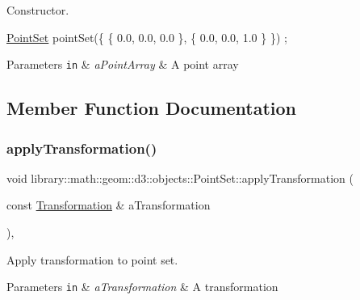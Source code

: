 Constructor. 


\begin{DoxyCode}
\hyperlink{classlibrary_1_1math_1_1geom_1_1d3_1_1objects_1_1_point_set_a6f9624b8c6bb3aa9d57a35a6fa2e0fba}{PointSet} pointSet(\{ \{ 0.0, 0.0, 0.0 \}, \{ 0.0, 0.0, 1.0 \} \}) ;
\end{DoxyCode}



\begin{DoxyParams}[1]{Parameters}
\mbox{\tt in}  & {\em a\+Point\+Array} & A point array \\
\hline
\end{DoxyParams}


\subsection{Member Function Documentation}
\mbox{\label{classlibrary_1_1math_1_1geom_1_1d3_1_1objects_1_1_point_set_aa747a6169cd9c14011c8249a728c3c48}} 
\subsubsection{\texorpdfstring{apply\+Transformation()}{applyTransformation()}}
{\footnotesize\ttfamily void library\+::math\+::geom\+::d3\+::objects\+::\+Point\+Set\+::apply\+Transformation (\begin{DoxyParamCaption}\item[{const \hyperlink{classlibrary_1_1math_1_1geom_1_1d3_1_1_transformation}{Transformation} \&}]{a\+Transformation }\end{DoxyParamCaption})\hspace{0.3cm}{\ttfamily [override]}, {\ttfamily [virtual]}}



Apply transformation to point set. 


\begin{DoxyParams}[1]{Parameters}
\mbox{\tt in}  & {\em a\+Transformation} & A transformation \\
\hline
\end{DoxyParams}


